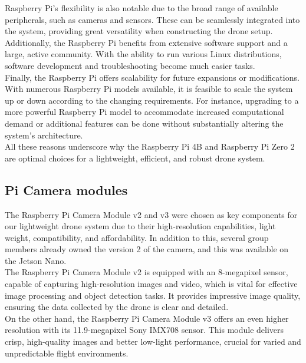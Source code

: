 Raspberry Pi's flexibility is also notable due to the broad range of available peripherals, such as cameras and sensors. These can be seamlessly integrated into the system, providing great versatility when constructing the drone setup. Additionally, the Raspberry Pi benefits from extensive software support and a large, active community. With the ability to run various Linux distributions, software development and troubleshooting become much easier tasks.\\

Finally, the Raspberry Pi offers scalability for future expansions or modifications. With numerous Raspberry Pi models available, it is feasible to scale the system up or down according to the changing requirements. For instance, upgrading to a more powerful Raspberry Pi model to accommodate increased computational demand or additional features can be done without substantially altering the system's architecture.\\

All these reasons underscore why the Raspberry Pi 4B and Raspberry Pi Zero 2 are optimal choices for a lightweight, efficient, and robust drone system.\\

\subsection{Pi Camera modules}

The Raspberry Pi Camera Module v2 and v3 were chosen as key components for our lightweight drone system due to their high-resolution capabilities, light weight, compatibility, and affordability. In addition to this, several group members already owned the version 2 of the camera, and this was available on the Jetson Nano.\\

The Raspberry Pi Camera Module v2 is equipped with an 8-megapixel sensor, capable of capturing high-resolution images and video, which is vital for effective image processing and object detection tasks. It provides impressive image quality, ensuring the data collected by the drone is clear and detailed.\\

On the other hand, the Raspberry Pi Camera Module v3 offers an even higher resolution with its 11.9-megapixel Sony IMX708 sensor. This module delivers crisp, high-quality images and better low-light performance, crucial for varied and unpredictable flight environments.\\

